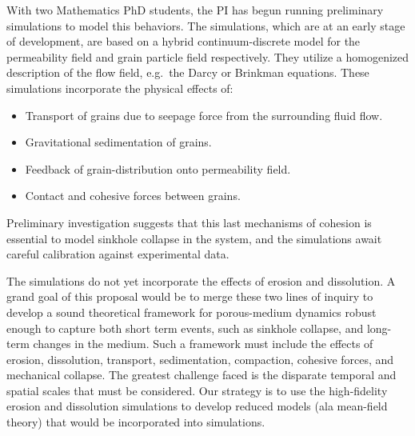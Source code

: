\documentclass[12pt]{article}
\begin{document}
	With two Mathematics PhD students, the PI has begun running preliminary simulations to model this behaviors. The simulations, which are at an early stage of development, are based on a hybrid continuum-discrete model for the permeability field and grain particle field respectively. They utilize a homogenized description of the flow field, e.g.~the Darcy or Brinkman equations.
These simulations incorporate the physical effects of:
\begin{itemize}
\item Transport of grains due to seepage force from the surrounding fluid flow.
\item Gravitational sedimentation of grains.
\item Feedback of grain-distribution onto permeability field.
\item Contact and cohesive forces between grains.
\end{itemize}
Preliminary investigation suggests that this last mechanisms of cohesion is essential to model sinkhole collapse in the system, and the simulations await careful calibration against experimental data.

The simulations do not yet incorporate the effects of erosion and dissolution. A grand goal of this proposal would be to merge these two lines of inquiry to develop a sound theoretical framework for porous-medium dynamics robust enough to capture both short term events, such as sinkhole collapse, and long-term changes in the medium. Such a framework must include the effects of erosion, dissolution, transport, sedimentation, compaction, cohesive forces, and mechanical collapse. The greatest challenge faced is the disparate temporal and spatial scales that must be considered. Our strategy is to use the high-fidelity erosion and dissolution simulations to develop reduced models (ala mean-field theory) that would be incorporated into simulations.






\end{document}
